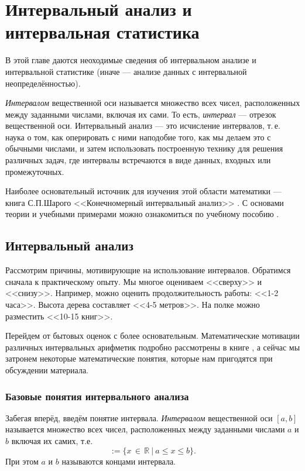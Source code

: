 \documentclass[a5paper,openany]{book}
\begin{document}
\chapter{Интервальный анализ и интервальная статистика}\label{InteAnalData}

В этой главе даются неоходимые сведения об интервальном анализе и интервальной статистике (иначе --- анализе данных с интервальной неопределённостью). 

\emph{Интервалом} вещественной оси называется множество всех чисел, 
расположенных между заданными числами, включая их сами. То есть,  \emph{интервал} --- отрезок вещественной оси.
Интервальный анализ --- это исчисление интервалов, т.\,е. 
наука о том, как оперировать с ними наподобие того, как мы делаем это с обычными 
числами, и затем использовать построенную технику для решения различных задач, где 
интервалы встречаются в виде данных, входных или промежуточных.   

Наиболее основательный источник для изучения этой области математики --- книга С.П.Шарого <<Конечномерный интервальный анализ>> \cite{SharyBook}.
С основами теории и учебными примерами можно ознакомиться по учебному пособию \cite{Bazhenov2020}.

\section{Интервальный анализ} \label{InteAnalysis}

Рассмотрим причины, мотивирующие на использование интервалов.  
Обратимся сначала к практическому опыту. Мы многое оцениваем <<сверху>> и  <<снизу>>. Например, можно оценить продолжительность работы: <<1-2 часа>>. Высота дерева составляет <<4-5 метров>>. На полке можно разместить <<10-15 книг>>.

Перейдем от бытовых оценок с более основательным.
Математические мотивации различных интервальных арифметик подробно рассмотрены в книге \cite{SharyBook}, а сейчас мы затронем некоторые математические понятия, которые нам пригодятся при обсуждении материала.


\subsection{Базовые понятия интервального анализа} \label{InteAnalysisBasic}

Забегая вперёд, введём понятие интервала.
\emph{Интервалом} вещественной оси $[a,b]$ называется множество всех чисел, расположенных между заданными числами  $a$ и $b$ включая их самих, т.е. 
\begin{equation*}
	[a,b]:= \{x\, \in \,\mathbb{R}\ |\ a \leq x \leq b \}.
\end{equation*}
При этом $a$ и $b$  называются концами интервала.
\end{document}
